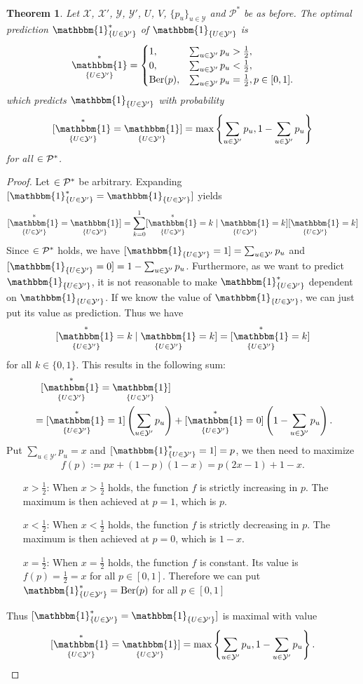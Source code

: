 \documentclass[twoside,a4paper]{article}
\theoremstyle{plain}
\newtheorem{theorem}{Theorem}[section]
\theoremstyle{definition}
\theoremstyle{remark}
\numberwithin{equation}{section}
\let\P\relax
\DeclareMathOperator{\P}{\mathbb{P}}
\DeclareMathOperator{\1}{\mathbbm{1}}
\newcommand{\X}{\mathcal{X}}
\newcommand{\Y}{\mathcal{Y}}
\newcommand{\Pmod}{\mathcal{P}^*}
\newcommand{\GeneralGenInd}{\1_{\{U\in\Y'\}}}
\begin{document}
\begin{theorem}\label{thm:DiscAccOpt}
Let $\X$, $\X'$, $\Y$, $\Y'$, $U$, $V$, $\{p_u\}_{u\in\Y}$ and $\Pmod$ be as before. The optimal prediction $\GeneralGenInd^*$ of $\GeneralGenInd$ is \[\GeneralGenInd^*=\begin{cases}
1,&\sum_{u\in\Y'}p_u>\frac{1}{2},\\
0,&\sum_{u\in\Y'}p_u<\frac{1}{2},\\
\mathrm{Ber}(p),&\sum_{u\in\Y'}p_u=\frac{1}{2},p\in[0,1].
\end{cases}\]
which predicts $\GeneralGenInd$ with probability 
\[\P[\GeneralGenInd^*=\GeneralGenInd]=\max\left\{\sum_{u\in\Y'}p_u,1-\sum_{u\in\Y'}p_u\right\}\] for all $\P\in\Pmod$.
\end{theorem}
\begin{proof}
Let $\P\in\Pmod$ be arbitrary. Expanding $\P[\GeneralGenInd^*=\GeneralGenInd]$ yields
\[\P[\GeneralGenInd^*=\GeneralGenInd]=\sum_{k=0}^1\P[\GeneralGenInd^*=k\mid\GeneralGenInd=k]\P[\GeneralGenInd=k]\]
Since $\P\in\Pmod$ holds, we have $\P[\GeneralGenInd=1]=\sum_{u\in\Y'}p_u$ and $\P[\GeneralGenInd=0]=1-\sum_{u\in\Y'}p_u$. Furthermore, as we want to predict $\GeneralGenInd$, it is not reasonable to make $\GeneralGenInd^*$ dependent on $\GeneralGenInd$. If we know the value of $\GeneralGenInd$, we can just put its value as prediction. Thus we have
\[\P[\GeneralGenInd^*=k\mid\GeneralGenInd=k]=\P[\GeneralGenInd^*=k]\]
for all $k\in\{0,1\}$. This results in the following sum:
\begin{align*}
&\phantom{=}\P[\GeneralGenInd^*=\GeneralGenInd]\\
&=\P[\GeneralGenInd^*=1]\left(\sum_{u\in\Y'}p_u\right)+\P[\GeneralGenInd^*=0]\left(1-\sum_{u\in\Y'}p_u\right).
\end{align*}
Put $\sum_{u\in\Y'}p_u=x$ and $\P[\GeneralGenInd^*=1]=p$, we then need to maximize
\[f(p):=px+(1-p)(1-x)=p(2x-1)+1-x.\]
\begin{itemize}
	\item[$x>\frac{1}{2}$:] When $x>\frac{1}{2}$ holds, the function $f$ is strictly increasing in $p$. The maximum is then achieved at $p=1$, which is $p$.
	\item[$x<\frac{1}{2}$:] When $x<\frac{1}{2}$ holds, the function $f$ is strictly decreasing in $p$. The maximum is then achieved at $p=0$, which is $1-x$.
	\item[$x=\frac{1}{2}$:] When $x=\frac{1}{2}$ holds, the function $f$ is constant. Its value is $f(p)=\frac{1}{2}=x$ for all $p\in[0,1]$. Therefore we can put $\GeneralGenInd^*=\mathrm{Ber}(p)$ for all $p\in[0,1]$
\end{itemize}
Thus $\P[\GeneralGenInd^*=\GeneralGenInd]$ is maximal with value \[\P[\GeneralGenInd^*=\GeneralGenInd]=\max\left\{\sum_{u\in\Y'}p_u,1-\sum_{u\in\Y'}p_u\right\}.\]
\end{proof}
\end{document}
